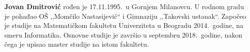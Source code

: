 \documentclass[12pt,oneside]{memoir}
\begin{document}
\backmatter


\begin{biografija}
  \textbf{Jovan Dmitrović} rođen je 17.11.1995.\ u Gornjem Milanovcu.
  U rodnom gradu je pohađao OŠ ,,Momčilo Nastasijević`` i Gimnaziju
  ,,Takovski ustanak``.
  Započeo je studije na Matematičkom fakultetu Univerziteta u Beogradu
  2014.\ godine, na smeru Informatika. Osnovne studije je završio
  u septembru 2018.\ godine, nakon čega je upisao master studije
  na istom fakultetu.
\end{biografija}
\end{document}
